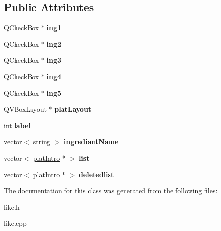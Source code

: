 \subsection*{Public Attributes}
\begin{DoxyCompactItemize}
\item 
Q\+Check\+Box $\ast$ {\bfseries ing1}\hypertarget{class_like_a8080eecf6250ec5852f436b9641f3c09}{}\label{class_like_a8080eecf6250ec5852f436b9641f3c09}

\item 
Q\+Check\+Box $\ast$ {\bfseries ing2}\hypertarget{class_like_ad09dec9a7ebc761378e532875bfa31fd}{}\label{class_like_ad09dec9a7ebc761378e532875bfa31fd}

\item 
Q\+Check\+Box $\ast$ {\bfseries ing3}\hypertarget{class_like_a32e570488089a0f2a92689a8f152b334}{}\label{class_like_a32e570488089a0f2a92689a8f152b334}

\item 
Q\+Check\+Box $\ast$ {\bfseries ing4}\hypertarget{class_like_a02ccb8c023f736b7a535cd93eab7612d}{}\label{class_like_a02ccb8c023f736b7a535cd93eab7612d}

\item 
Q\+Check\+Box $\ast$ {\bfseries ing5}\hypertarget{class_like_a08638a9956051cd61102e92e749c7bce}{}\label{class_like_a08638a9956051cd61102e92e749c7bce}

\item 
Q\+V\+Box\+Layout $\ast$ {\bfseries plat\+Layout}\hypertarget{class_like_aacff3597e99f7ab6b31953a5e7103133}{}\label{class_like_aacff3597e99f7ab6b31953a5e7103133}

\item 
int {\bfseries label}\hypertarget{class_like_aa67d5bf4c7d3272671012e2cb4a0e822}{}\label{class_like_aa67d5bf4c7d3272671012e2cb4a0e822}

\item 
vector$<$ string $>$ {\bfseries ingrediant\+Name}\hypertarget{class_like_afa5837420ab339db4ba713e97acac863}{}\label{class_like_afa5837420ab339db4ba713e97acac863}

\item 
vector$<$ \hyperlink{classplat_intro}{plat\+Intro} $\ast$ $>$ {\bfseries list}\hypertarget{class_like_a1852fe305012c8a4a13fdc4cd04dd0b4}{}\label{class_like_a1852fe305012c8a4a13fdc4cd04dd0b4}

\item 
vector$<$ \hyperlink{classplat_intro}{plat\+Intro} $\ast$ $>$ {\bfseries deletedlist}\hypertarget{class_like_a9146ca347e7e59e3eb662ad71ed3f6b8}{}\label{class_like_a9146ca347e7e59e3eb662ad71ed3f6b8}

\end{DoxyCompactItemize}


The documentation for this class was generated from the following files\+:\begin{DoxyCompactItemize}
\item 
like.\+h\item 
like.\+cpp\end{DoxyCompactItemize}
